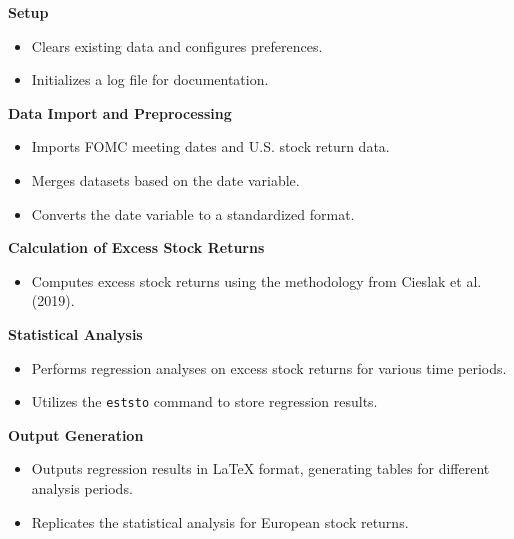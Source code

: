 \textbf{Setup}
\begin{itemize}
    \item Clears existing data and configures preferences.
    \item Initializes a log file for documentation.
\end{itemize}

\textbf{Data Import and Preprocessing}
\begin{itemize}
    \item Imports FOMC meeting dates and U.S. stock return data.
    \item Merges datasets based on the date variable.
    \item Converts the date variable to a standardized format.
\end{itemize}

\textbf{Calculation of Excess Stock Returns}
\begin{itemize}
    \item Computes excess stock returns using the methodology from Cieslak et al. (2019).
\end{itemize}

\textbf{Statistical Analysis}
\begin{itemize}
    \item Performs regression analyses on excess stock returns for various time periods.
    \item Utilizes the \texttt{eststo} command to store regression results.
\end{itemize}

\textbf{Output Generation}
\begin{itemize}
    \item Outputs regression results in LaTeX format, generating tables for different analysis periods.
    \item Replicates the statistical analysis for European stock returns.
\end{itemize}




